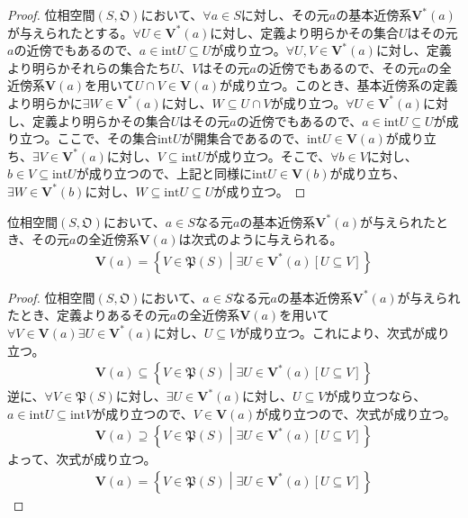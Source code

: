 \documentclass[dvipdfmx]{jsarticle}
\begin{document}
\begin{proof}
位相空間$\left( S,\mathfrak{O} \right)$において、$\forall a \in S$に対し、その元$a$の基本近傍系$\mathbf{V}^{*}(a)$が与えられたとする。$\forall U \in \mathbf{V}^{*}(a)$に対し、定義より明らかその集合$U$はその元$a$の近傍でもあるので、$a \in {\mathrm{int}}U \subseteq U$が成り立つ。$\forall U,V \in \mathbf{V}^{*}(a)$に対し、定義より明らかそれらの集合たち$U$、$V$はその元$a$の近傍でもあるので、その元$a$の全近傍系$\mathbf{V}(a)$を用いて$U \cap V \in \mathbf{V}(a)$が成り立つ。このとき、基本近傍系の定義より明らかに$\exists W \in \mathbf{V}^{*}(a)$に対し、$W \subseteq U \cap V$が成り立つ。$\forall U \in \mathbf{V}^{*}(a)$に対し、定義より明らかその集合$U$はその元$a$の近傍でもあるので、$a \in {\mathrm{int}}U \subseteq U$が成り立つ。ここで、その集合${\mathrm{int}}U$が開集合であるので、${\mathrm{int}}U \in \mathbf{V}(a)$が成り立ち、$\exists V \in \mathbf{V}^{*}(a)$に対し、$V \subseteq {\mathrm{int}}U$が成り立つ。そこで、$\forall b \in V$に対し、$b \in V \subseteq {\mathrm{int}}U$が成り立つので、上記と同様に${\mathrm{int}}U \in \mathbf{V}(b)$が成り立ち、$\exists W \in \mathbf{V}^{*}(b)$に対し、$W \subseteq {\mathrm{int}}U \subseteq U$が成り立つ。
\end{proof}
\begin{thm}\label{8.1.2.13}
位相空間$\left( S,\mathfrak{O} \right)$において、$a \in S$なる元$a$の基本近傍系$\mathbf{V}^{*}(a)$が与えられたとき、その元$a$の全近傍系$\mathbf{V}(a)$は次式のように与えられる。
\begin{align*}
\mathbf{V}(a) = \left\{ V \in \mathfrak{P}(S) \middle| \exists U \in \mathbf{V}^{*}(a)[ U \subseteq V] \right\}
\end{align*}
\end{thm}
\begin{proof}
位相空間$\left( S,\mathfrak{O} \right)$において、$a \in S$なる元$a$の基本近傍系$\mathbf{V}^{*}(a)$が与えられたとき、定義よりあるその元$a$の全近傍系$\mathbf{V}(a)$を用いて$\forall V \in \mathbf{V}(a)\exists U \in \mathbf{V}^{*}(a)$に対し、$U \subseteq V$が成り立つ。これにより、次式が成り立つ。
\begin{align*}
\mathbf{V}(a) \subseteq \left\{ V \in \mathfrak{P}(S) \middle| \exists U \in \mathbf{V}^{*}(a)[ U \subseteq V] \right\}
\end{align*}
逆に、$\forall V \in \mathfrak{P}(S)$に対し、$\exists U \in \mathbf{V}^{*}(a)$に対し、$U \subseteq V$が成り立つなら、$a \in {\mathrm{int}}U \subseteq {\mathrm{int}}V$が成り立つので、$V \in \mathbf{V}(a)$が成り立つので、次式が成り立つ。
\begin{align*}
\mathbf{V}(a) \supseteq \left\{ V \in \mathfrak{P}(S) \middle| \exists U \in \mathbf{V}^{*}(a)[ U \subseteq V] \right\}
\end{align*}
よって、次式が成り立つ。
\begin{align*}
\mathbf{V}(a) = \left\{ V \in \mathfrak{P}(S) \middle| \exists U \in \mathbf{V}^{*}(a)[ U \subseteq V] \right\}
\end{align*}
\end{proof}
\end{document}
